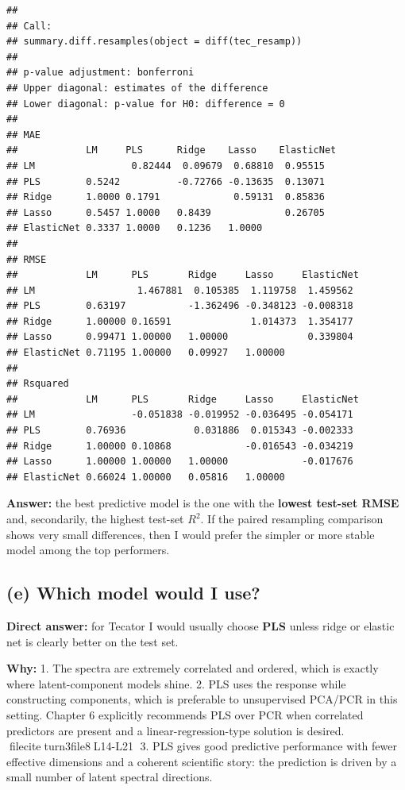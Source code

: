 \documentclass[
  11pt,
]{article}
\begin{document}
\begin{verbatim}
## 
## Call:
## summary.diff.resamples(object = diff(tec_resamp))
## 
## p-value adjustment: bonferroni 
## Upper diagonal: estimates of the difference
## Lower diagonal: p-value for H0: difference = 0
## 
## MAE 
##            LM     PLS      Ridge    Lasso    ElasticNet
## LM                 0.82444  0.09679  0.68810  0.95515  
## PLS        0.5242          -0.72766 -0.13635  0.13071  
## Ridge      1.0000 0.1791             0.59131  0.85836  
## Lasso      0.5457 1.0000   0.8439             0.26705  
## ElasticNet 0.3337 1.0000   0.1236   1.0000             
## 
## RMSE 
##            LM      PLS       Ridge     Lasso     ElasticNet
## LM                  1.467881  0.105385  1.119758  1.459562 
## PLS        0.63197           -1.362496 -0.348123 -0.008318 
## Ridge      1.00000 0.16591              1.014373  1.354177 
## Lasso      0.99471 1.00000   1.00000              0.339804 
## ElasticNet 0.71195 1.00000   0.09927   1.00000             
## 
## Rsquared 
##            LM      PLS       Ridge     Lasso     ElasticNet
## LM                 -0.051838 -0.019952 -0.036495 -0.054171 
## PLS        0.76936            0.031886  0.015343 -0.002333 
## Ridge      1.00000 0.10868             -0.016543 -0.034219 
## Lasso      1.00000 1.00000   1.00000             -0.017676 
## ElasticNet 0.66024 1.00000   0.05816   1.00000
\end{verbatim}

\textbf{Answer:} the best predictive model is the one with the
\textbf{lowest test-set RMSE} and, secondarily, the highest test-set
\(R^2\). If the paired resampling comparison shows very small
differences, then I would prefer the simpler or more stable model among
the top performers.

\subsection{(e) Which model would I
use?}\label{e-which-model-would-i-use}

\textbf{Direct answer:} for Tecator I would usually choose \textbf{PLS}
unless ridge or elastic net is clearly better on the test set.

\textbf{Why:} 1. The spectra are extremely correlated and ordered, which
is exactly where latent-component models shine. 2. PLS uses the response
while constructing components, which is preferable to unsupervised
PCA/PCR in this setting. Chapter 6 explicitly recommends PLS over PCR
when correlated predictors are present and a linear-regression-type
solution is desired. fileciteturn3file8L14-L21 3. PLS gives good
predictive performance with fewer effective dimensions and a coherent
scientific story: the prediction is driven by a small number of latent
spectral directions.
\end{document}
